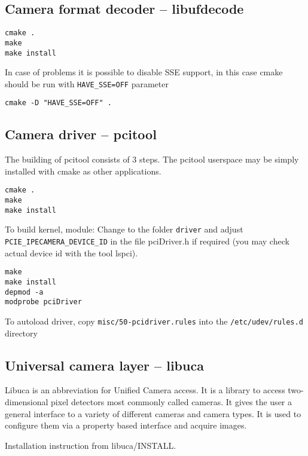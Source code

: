 \subsection{Camera format decoder -- libufdecode}
\begin{verbatim}
cmake .
make 
make install
\end{verbatim}

In case of problems it is possible to disable SSE support, in this case cmake should be run with \verb/HAVE_SSE=OFF/ parameter
\begin{verbatim}
cmake -D "HAVE_SSE=OFF" .
\end{verbatim}


\subsection{Camera driver -- pcitool}
The building of pcitool consists of 3 steps. The pcitool userspace may be simply installed with cmake as other applications.
\begin{verbatim}
cmake .
make
make install
\end{verbatim}

To build kernel, module:
Change to the folder \verb/driver/ and adjust  \verb/PCIE_IPECAMERA_DEVICE_ID/ in the file pciDriver.h if required (you may check actual device id with the tool lspci).
\begin{verbatim}
make
make install
depmod -a
modprobe pciDriver
\end{verbatim}
To autoload driver, copy \verb|misc/50-pcidriver.rules| into the \verb|/etc/udev/rules.d| directory



\subsection{Universal camera layer -- libuca}

Libuca is an abbreviation for Unified Camera access. It is a library to access two-dimensional pixel detectors most commonly called cameras. It gives the user a general interface to a variety of different cameras and camera types. It is used to configure them via a property based
interface and acquire images.

Installation instruction from libuca/INSTALL.

